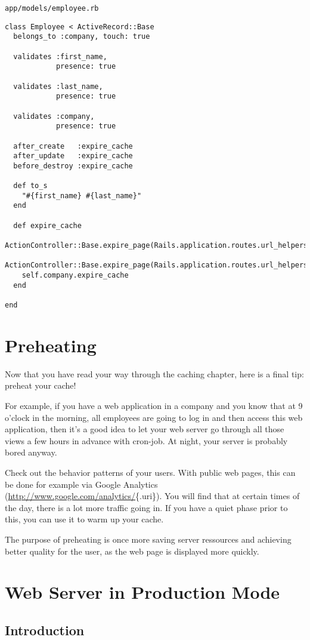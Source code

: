 \documentclass[a4paper]{book}
\newcommand{\chap}[1]{\newpage\thispagestyle{empty}\chapter{#1}\label{chap:\thechapter}}
\begin{document}
\texttt{app/models/employee.rb}

\begin{shaded}\begin{verbatim}
class Employee < ActiveRecord::Base
  belongs_to :company, touch: true

  validates :first_name,
            presence: true

  validates :last_name,
            presence: true

  validates :company,
            presence: true

  after_create   :expire_cache
  after_update   :expire_cache
  before_destroy :expire_cache

  def to_s
    "#{first_name} #{last_name}"
  end

  def expire_cache
    ActionController::Base.expire_page(Rails.application.routes.url_helpers.employee_path(self))
    ActionController::Base.expire_page(Rails.application.routes.url_helpers.employees_path)
    self.company.expire_cache
  end

end
\end{verbatim}\end{shaded}

\chap{Preheating}\label{preheating}

Now that you have read your way through the caching chapter, here is a final tip: preheat your cache!

For example, if you have a web application in a company and you know that at 9 o'clock in the morning, all employees are going to log in and then access this web application, then it's a good idea to let your web server go through all those views a few hours in advance with cron-job. At night, your server is probably bored anyway.

Check out the behavior patterns of your users. With public web pages, this can be done for example via Google Analytics (\url{http://www.google.com/analytics/}\{.uri\}). You will find that at certain times of the day, there is a lot more traffic going in. If you have a quiet phase prior to this, you can use it to warm up your cache.

The purpose of preheating is once more saving server ressources and achieving better quality for the user, as the web page is displayed more quickly.

\chap{Web Server in Production Mode}\label{web-server-in-production-mode}

\section{Introduction}\label{introduction-8}
\end{document}

